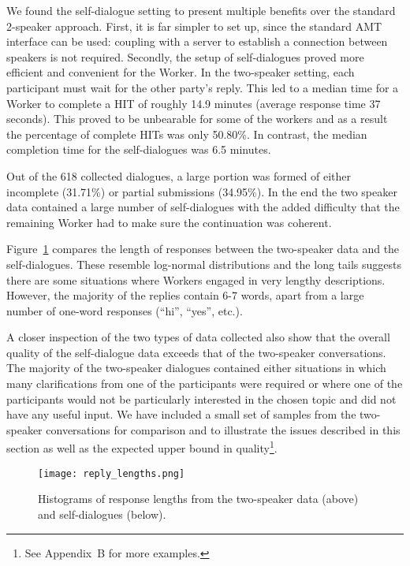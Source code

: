 \documentclass[11pt,a4paper]{article}
\begin{document}
We found the self-dialogue setting to present multiple benefits over the standard 2-speaker approach. First, it is far simpler to set up, since the standard AMT interface can be used: coupling with a server to establish a connection between speakers is not required. Secondly, the setup of self-dialogues proved more efficient and convenient for the Worker. In the two-speaker setting, each participant must wait for the other party's reply.  This led to a median time for a Worker to complete a HIT of roughly 14.9 minutes (average response time 37 seconds). This proved to be unbearable for some of the workers and as a result the percentage of complete HITs was only 50.80\%. In contrast, the median completion time for the self-dialogues was 6.5 minutes.

Out of the 618 collected dialogues, a large portion was formed of either incomplete (31.71\%) or partial submissions (34.95\%). In the end the two speaker data contained a large number of self-dialogues with the added difficulty that the remaining Worker had to make sure the continuation was coherent.

Figure~\ref{fig:lengths} compares the length of responses between the two-speaker data and the self-dialogues. These resemble log-normal distributions and the long tails suggests there are some situations where  Workers engaged in very lengthy descriptions. However, the majority of the replies contain 6-7 words, apart from a large number of one-word responses (``hi'', ``yes'', etc.).

A closer inspection of the two types of data collected also show that the overall quality of the self-dialogue data exceeds that of the two-speaker conversations. The majority of the two-speaker dialogues contained either situations in which many clarifications from one of the participants were required or where one of the participants would not be particularly interested in the chosen topic and did not have any useful input. We have included a small set of samples from the two-speaker conversations for comparison and to illustrate the issues described in this section as well as the expected upper bound in quality\footnote{See Appendix~B for more examples.}.

\begin{figure}[htpb]

  \centering
  \texttt{[image: reply\_lengths.png]}
  \caption{Histograms of response lengths from the two-speaker data (above) and self-dialogues (below).}
  \label{fig:lengths}
\end{figure}
\end{document}
